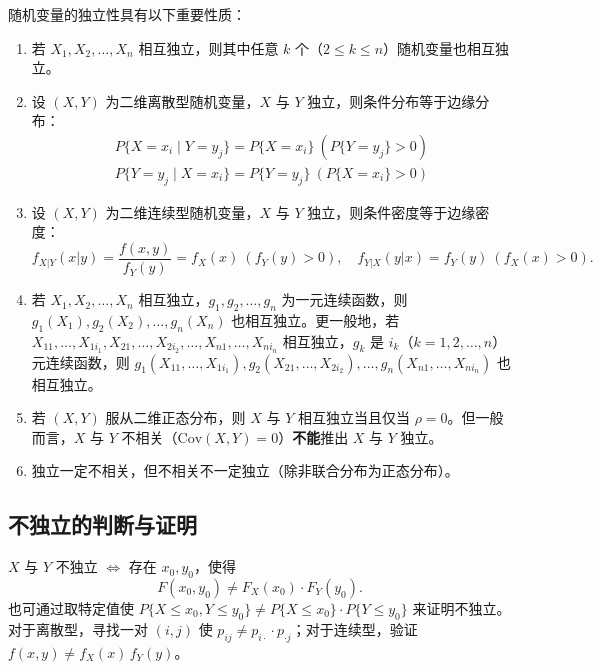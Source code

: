 ﻿\documentclass[lang=cn,11pt]{elegantbook}
\begin{document}
\begin{property}\label{prop:independence-implications}
随机变量的独立性具有以下重要性质：
\begin{enumerate}
    \item 若 $X_1, X_2, \dots, X_n$ 相互独立，则其中任意 $k$ 个（$2 \leqslant k \leqslant n$）随机变量也相互独立。
    \item 设 $(X,Y)$ 为二维离散型随机变量，$X$ 与 $Y$ 独立，则条件分布等于边缘分布：
    \begin{align*}
    P\{X = x_i \mid Y = y_j\} = P\{X = x_i\}\ (P\{Y = y_j\} > 0)\\
     P\{Y = y_j \mid X = x_i\} = P\{Y = y_j\}\ (P\{X = x_i\} > 0)
    \end{align*}
    \item 设 $(X,Y)$ 为二维连续型随机变量，$X$ 与 $Y$ 独立，则条件密度等于边缘密度：
    \[
    f_{X|Y}(x|y) = \frac{f(x,y)}{f_Y(y)} = f_X(x)\ (f_Y(y) > 0), \quad f_{Y|X}(y|x) = f_Y(y)\ (f_X(x) > 0).
    \]
    \item 若 $X_1, X_2, \dots, X_n$ 相互独立，$g_1, g_2, \dots, g_n$ 为一元连续函数，则 $g_1(X_1), g_2(X_2), \dots, g_n(X_n)$ 也相互独立。更一般地，若 $X_{11}, \dots, X_{1i_1}, X_{21}, \dots, X_{2i_2}, \dots, X_{n1}, \dots, X_{ni_n}$ 相互独立，$g_k$ 是 $i_k$（$k=1,2,\dots,n$）元连续函数，则 $g_1(X_{11}, \dots, X_{1i_1}), g_2(X_{21}, \dots, X_{2i_2}), \dots, g_n(X_{n1}, \dots, X_{ni_n})$ 也相互独立。
    \item 若 $(X,Y)$ 服从二维正态分布，则 $X$ 与 $Y$ 相互独立当且仅当 $\rho = 0$。但一般而言，$X$ 与 $Y$ 不相关（$\mathrm{Cov}(X,Y) = 0$）\textbf{不能}推出 $X$ 与 $Y$ 独立。
    \item 独立一定不相关，但不相关不一定独立（除非联合分布为正态分布）。
\end{enumerate}
\end{property}

\subsection{不独立的判断与证明}

\begin{property}[不独立的判定]\label{prop:dependence-criterion}
$X$ 与 $Y$ 不独立 $\iff$ 存在 $x_0, y_0$，使得
\[
F(x_0, y_0) \neq F_X(x_0) \cdot F_Y(y_0).
\]
也可通过取特定值使 $P\{X \leqslant x_0, Y \leqslant y_0\} \neq P\{X \leqslant x_0\} \cdot P\{Y \leqslant y_0\}$ 来证明不独立。对于离散型，寻找一对 $(i,j)$ 使 $p_{ij} \neq p_{i\cdot} \cdot p_{\cdot j}$；对于连续型，验证 $f(x,y) \neq f_X(x)\,f_Y(y)$。
\end{property}
\end{document}
